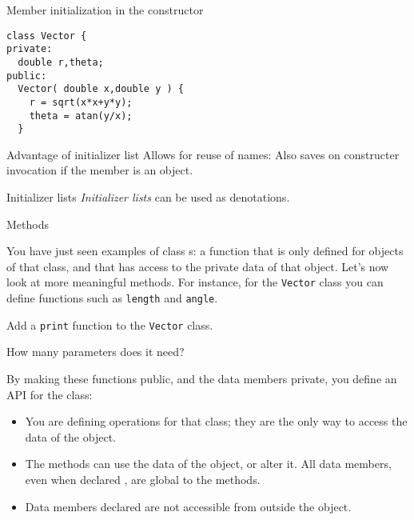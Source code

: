 \begin{block}{Member initialization in the constructor}
  \label{sl:class-set}
\begin{lstlisting}
class Vector {
private:
  double r,theta;
public:
  Vector( double x,double y ) {
    r = sqrt(x*x+y*y);
    theta = atan(y/x);
  }
\end{lstlisting}
\end{block}

\begin{block}{Advantage of initializer list}
  \label{sl:class-init-why}
  Allows for reuse of names:
  Also saves on constructer invocation if the member is an object.
\end{block}

\begin{block}{Initializer lists}
  \label{sl:class-inlist}
  \emph{Initializer lists} can be used as denotations.
\end{block}

 {Methods}

You have just seen examples of class
s: a function that is only defined for objects of
that class, and that has access to the private data of that object.
Let's now look at more meaningful methods. For instance, for the
\lstinline{Vector} class you can define functions such as \lstinline{length} and
\lstinline{angle}. 
%

\begin{exercise}
  \label{ex:vectorclass-print}
  Add a \lstinline{print} function to the \lstinline{Vector} class.

  How many parameters does it need?
\end{exercise}

By making these functions public, and the data members
private, you define an \acf{API} for the class:
\begin{itemize}
\item You are defining operations for that class; they are the only
  way to access the data of the object.
\item The methods can use the data of the object, or alter it. All
  data members, even when declared , are global to the methods.
\item  Data members declared  are not accessible from outside the
  object.
\end{itemize}

